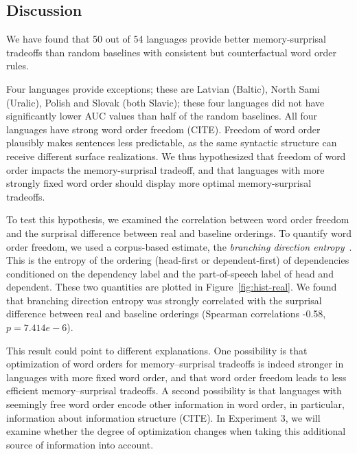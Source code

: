 \subsection{Discussion}

We have found that 50 out of 54 languages provide better memory-surprisal tradeoffs than random baselines with consistent but counterfactual word order rules.

Four languages provide exceptions; these are Latvian (Baltic), North Sami (Uralic), Polish and Slovak (both Slavic); these four languages did not have significantly lower AUC values than half of the random baselines.
All four languages have strong word order freedom (CITE).
Freedom of word order plausibly makes sentences less predictable, as the same syntactic structure can receive different surface realizations.
We thus hypothesized that freedom of word order impacts the memory-surprisal tradeoff, and that languages with more strongly fixed word order should display more optimal memory-surprisal tradeoffs.

To test this hypothesis, we examined the correlation between word order freedom and the surprisal difference between real and baseline orderings.
To quantify word order freedom, we used a corpus-based estimate, the \emph{branching direction entropy}~\citep{futrell-quantifying-2015}.
This is the entropy of the ordering (head-first or dependent-first) of dependencies conditioned on the dependency label and the part-of-speech label of head and dependent.
These two quantities are plotted in Figure~\ref{fig:hist-real}.
We found that branching direction entropy was strongly correlated with the surprisal difference between real and baseline orderings (Spearman correlations -0.58, $p = 7.414e-6$).

This result could point to different explanations.
One possibility is that optimization of word orders for memory--surprisal tradeoffs is indeed stronger in languages with more fixed word order, and that word order freedom leads to less efficient memory--surprisal tradeoffs.
A second possibility is that languages with seemingly free word order encode other information in word order, in particular, information about information structure (CITE).
In Experiment 3, we will examine whether the degree of optimization changes when taking this additional source of information into account.



